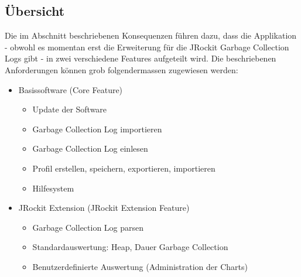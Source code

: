 \subsection{Übersicht}
Die im Abschnitt  beschriebenen Konsequenzen führen dazu, dass die Applikation - obwohl es momentan erst die Erweiterung für die JRockit Garbage Collection Logs gibt - in zwei verschiedene Features aufgeteilt wird. Die beschriebenen Anforderungen können grob folgendermassen zugewiesen werden:
\begin{itemize}
	\item Basissoftware (Core Feature)
		\begin{itemize}
			\item Update der Software
			\item Garbage Collection Log importieren
			\item Garbage Collection Log einlesen
			\item Profil erstellen, speichern, exportieren, importieren
			\item Hilfesystem
		\end{itemize}
	\item JRockit Extension (JRockit Extension Feature)
		\begin{itemize}
			\item Garbage Collection Log parsen
			\item Standardauswertung: Heap, Dauer Garbage Collection
			\item Benutzerdefinierte Auswertung (Administration der Charts)
		\end{itemize}
\end{itemize}


